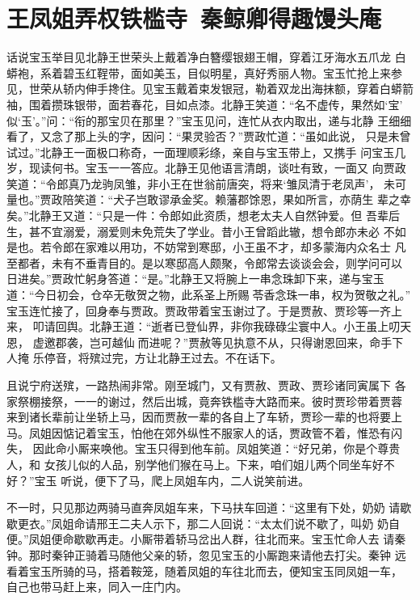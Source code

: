 \chapter{王凤姐弄权铁槛寺~秦鲸卿得趣馒头庵}

话说宝玉举目见北静王世荣头上戴着净白簪缨银翅王帽，穿着江牙海水五爪龙
白蟒袍，系着碧玉红鞓带，面如美玉，目似明星，真好秀丽人物。宝玉忙抢上来参
见，世荣从轿内伸手搀住。见宝玉戴着束发银冠，勒着双龙出海抹额，穿着白蟒箭
袖，围着攒珠银带，面若春花，目如点漆。北静王笑道：“名不虚传，果然如‘宝’
似‘玉’。”问：“衔的那宝贝在那里？”宝玉见问，连忙从衣内取出，递与北静
王细细看了，又念了那上头的字，因问：“果灵验否？”贾政忙道：“虽如此说，
只是未曾试过。”北静王一面极口称奇，一面理顺彩绦，亲自与宝玉带上，又携手
问宝玉几岁，现读何书。宝玉一一答应。北静王见他语言清朗，谈吐有致，一面又
向贾政笑道：“令郎真乃龙驹凤雏，非小王在世翁前唐突，将来‘雏凤清于老凤声’，
未可量也。”贾政陪笑道：“犬子岂敢谬承金奖。赖藩郡馀恩，果如所言，亦荫生
辈之幸矣。”北静王又道：“只是一件：令郎如此资质，想老太夫人自然钟爱。但
吾辈后生，甚不宜溺爱，溺爱则未免荒失了学业。昔小王曾蹈此辙，想令郎亦未必
不如是也。若令郎在家难以用功，不妨常到寒邸，小王虽不才，却多蒙海内众名士
凡至都者，未有不垂青目的。是以寒邸高人颇聚，令郎常去谈谈会会，则学问可以
日进矣。”贾政忙躬身答道：“是。”北静王又将腕上一串念珠卸下来，递与宝玉
道：“今日初会，仓卒无敬贺之物，此系圣上所赐苓香念珠一串，权为贺敬之礼。”
宝玉连忙接了，回身奉与贾政。贾政带着宝玉谢过了。于是贾赦、贾珍等一齐上来，
叩请回舆。北静王道：“逝者已登仙界，非你我碌碌尘寰中人。小王虽上叨天恩，
虚邀郡袭，岂可越仙而进呢？”贾赦等见执意不从，只得谢恩回来，命手下人掩
乐停音，将殡过完，方让北静王过去。不在话下。

且说宁府送殡，一路热闹非常。刚至城门，又有贾赦、贾政、贾珍诸同寅属下
各家祭棚接祭，一一的谢过，然后出城，竟奔铁槛寺大路而来。彼时贾珍带着贾蓉
来到诸长辈前让坐轿上马，因而贾赦一辈的各自上了车轿，贾珍一辈的也将要上
马。凤姐因惦记着宝玉，怕他在郊外纵性不服家人的话，贾政管不着，惟恐有闪失，
因此命小厮来唤他。宝玉只得到他车前。凤姐笑道：“好兄弟，你是个尊贵人，和
女孩儿似的人品，别学他们猴在马上。下来，咱们姐儿两个同坐车好不好？”宝玉
听说，便下了马，爬上凤姐车内，二人说笑前进。

不一时，只见那边两骑马直奔凤姐车来，下马扶车回道：“这里有下处，奶奶
请歇歇更衣。”凤姐命请邢王二夫人示下，那二人回说：“太太们说不歇了，叫奶
奶自便。”凤姐便命歇歇再走。小厮带着轿马岔出人群，往北而来。宝玉忙命人去
请秦钟。那时秦钟正骑着马随他父亲的轿，忽见宝玉的小厮跑来请他去打尖。秦钟
远看着宝玉所骑的马，搭着鞍笼，随着凤姐的车往北而去，便知宝玉同凤姐一车，
自己也带马赶上来，同入一庄门内。

